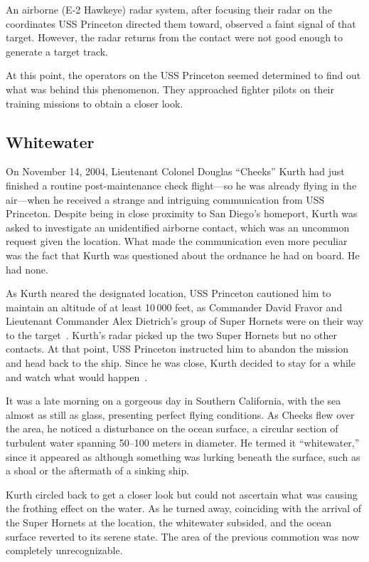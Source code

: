 An airborne (E-2 Hawkeye) radar system, after focusing their radar on the coordinates USS Princeton directed them toward,
observed a faint signal of that target.
However, the radar returns from the contact were not good enough to generate a target track.

At this point, the operators on the USS Princeton seemed determined to find out what was behind this phenomenon. They approached fighter pilots on their training missions to obtain a closer look.

\subsection{Whitewater}

On November 14, 2004, Lieutenant Colonel Douglas ``Cheeks'' Kurth had just finished a routine post-maintenance check flight---so he was already flying in the air---when
he received a strange and intriguing communication from USS Princeton.
Despite being in close proximity to San Diego's homeport, Kurth was asked to investigate an unidentified airborne contact,
which was an uncommon request given the location.
What made the communication even more peculiar was the fact that Kurth was questioned about the ordnance he had on board.
He had none.

As Kurth neared the designated location, USS Princeton cautioned him to maintain an altitude of at least 10\,000 feet,
as Commander David Fravor and Lieutenant Commander Alex Dietrich's group of Super Hornets
were on their way to the target~\cite{Dietrich-TicTac}.
Kurth's radar picked up the two Super Hornets but no other contacts.
At that point, USS Princeton instructed him to abandon the mission and head back to the ship.
Since he was close, Kurth decided to stay for a while and watch what would happen~\cite{Chierici2015Mar}.

It was a late morning on a gorgeous day in Southern California, with the sea almost as still as glass, presenting perfect flying conditions. As Cheeks flew over the area, he noticed a disturbance on the ocean surface, a circular section of turbulent water spanning 50--100 meters in diameter. He termed it ``whitewater,'' since it appeared as although something was lurking beneath the surface, such as a shoal or the aftermath of a sinking ship.

Kurth circled back to get a closer look but could not ascertain what was causing the frothing effect on the water.
As he turned away, coinciding with the arrival of the Super Hornets at the location,
the whitewater subsided, and the ocean surface reverted to its serene state.
The area of the previous commotion was now completely unrecognizable.

